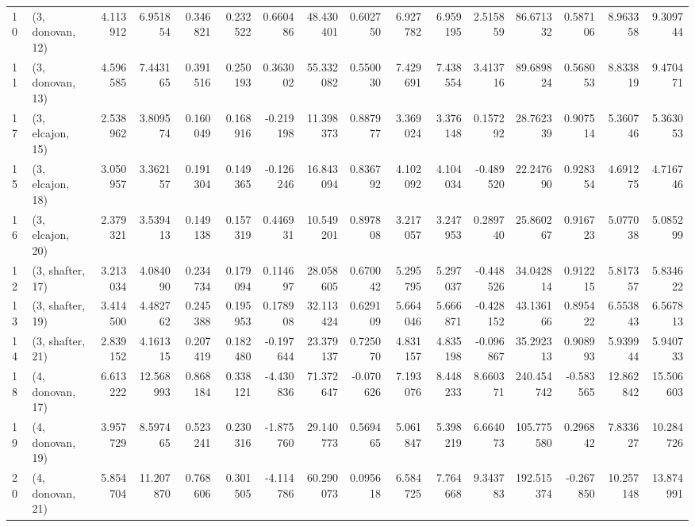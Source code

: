 \begin{tabular}{llrrrrrrrrrrrrrr}
10 &  (3, donovan, 12) &  4.113912 &   6.951854 &   0.346821 &  0.232522 &  0.660486 &   48.430401 &  0.602750 &   6.927782 &   6.959195 &  2.515859 &   86.671332 &  0.587106 &   8.963358 &   9.309744 \\
11 &  (3, donovan, 13) &  4.596585 &   7.443165 &   0.391516 &  0.250193 &  0.363002 &   55.332082 &  0.550030 &   7.429691 &   7.438554 &  3.413716 &   89.689824 &  0.568053 &   8.833819 &   9.470471 \\
17 &  (3, elcajon, 15) &  2.538962 &   3.809574 &   0.160049 &  0.168916 & -0.219198 &   11.398373 &  0.887977 &   3.369024 &   3.376148 &  0.157292 &   28.762339 &  0.907514 &   5.360746 &   5.363053 \\
15 &  (3, elcajon, 18) &  3.050957 &   3.362157 &   0.191304 &  0.149365 & -0.126246 &   16.843094 &  0.836792 &   4.102092 &   4.104034 & -0.489520 &   22.247690 &  0.928354 &   4.691275 &   4.716746 \\
16 &  (3, elcajon, 20) &  2.379321 &   3.539413 &   0.149138 &  0.157319 &  0.446931 &   10.549201 &  0.897808 &   3.217057 &   3.247953 &  0.289740 &   25.860267 &  0.916723 &   5.077038 &   5.085299 \\
12 &  (3, shafter, 17) &  3.213034 &   4.084090 &   0.234734 &  0.179094 &  0.114697 &   28.058605 &  0.670042 &   5.295795 &   5.297037 & -0.448526 &   34.042814 &  0.912215 &   5.817357 &   5.834622 \\
13 &  (3, shafter, 19) &  3.414500 &   4.482762 &   0.245388 &  0.195953 &  0.178908 &   32.113424 &  0.629109 &   5.664046 &   5.666871 & -0.428152 &   43.136166 &  0.895422 &   6.553843 &   6.567813 \\
14 &  (3, shafter, 21) &  2.839152 &   4.161315 &   0.207419 &  0.182480 & -0.197644 &   23.379137 &  0.725070 &   4.831157 &   4.835198 & -0.096867 &   35.292313 &  0.908993 &   5.939944 &   5.940733 \\
18 &  (4, donovan, 17) &  6.613222 &  12.568993 &   0.868184 &  0.338121 & -4.430836 &   71.372647 & -0.070626 &   7.193076 &   8.448233 &  8.660371 &  240.454742 & -0.583565 &  12.862842 &  15.506603 \\
19 &  (4, donovan, 19) &  3.957729 &   8.597465 &   0.523241 &  0.230316 & -1.875760 &   29.140773 &  0.569465 &   5.061847 &   5.398219 &  6.664073 &  105.775580 &  0.296842 &   7.833627 &  10.284726 \\
20 &  (4, donovan, 21) &  5.854704 &  11.207870 &   0.768606 &  0.301505 & -4.114786 &   60.290073 &  0.095618 &   6.584725 &   7.764668 &  9.343783 &  192.515374 & -0.267850 &  10.257148 &  13.874991 \\

\end{tabular}
